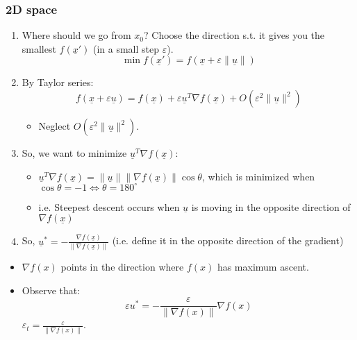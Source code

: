     \subsubsection{2D space}
    \begin{intuition}
        \begin{enumerate}
            \item Where should we go from \( x_0 \)? Choose the direction s.t. it gives you the smallest \( f(\underline{x}') \) (in a small step \( \varepsilon \)).
            \[
            \min f(\underline{x}') = f(\underline{x} + \varepsilon \| \underline{u} \|)
            \]
        
            \item By Taylor series:
            \[
            f(\underline{x} + \varepsilon \underline{u}) = f(\underline{x}) + \varepsilon \underline{u}^T \nabla f(\underline{x}) + O(\varepsilon^2 \|\underline{u}\|^2)
            \]
            \begin{itemize}
                \item Neglect $O(\varepsilon^2 \|\underline{u}\|^2)$.
            \end{itemize}
        
            \item So, we want to minimize \( \underline{u}^T \nabla f(\underline{x}) \):
            \begin{itemize}
                \item \( \underline{u}^T \nabla f(\underline{x}) = \|\underline{u}\| \| \nabla f(\underline{x})\| \cos \theta \), which is minimized when \( \cos \theta = -1 \Longleftrightarrow \theta = 180^\circ \)
                \item i.e. Steepest descent occurs when $\underline{u}$ is moving in the opposite direction of $\nabla f(\underline{x})$ 
            \end{itemize}
            
            \item So, \( \underline{u}^* = -\frac{\nabla f(\underline{x})}{\|\nabla f(\underline{x})\|} \) (i.e. define it in the opposite direction of the gradient)
        \end{enumerate}
        \vspace{1em}

        \begin{itemize}
            \item \( \nabla f(x) \) points in the direction where \( f(x) \) has maximum ascent.
        
            \item Observe that:
            \[
            \varepsilon u^* = -\frac{\varepsilon}{\|\nabla f(x)\|} \nabla f(x)
            \]
            \( \varepsilon_t = \frac{\varepsilon}{\|\nabla f(x)\|} \).
        \end{itemize}

    \end{intuition}

